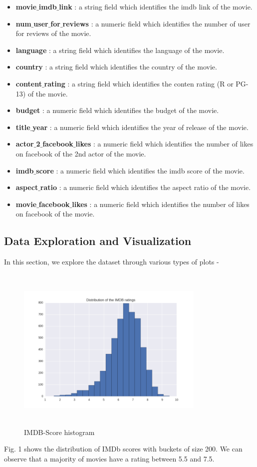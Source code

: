 \documentclass[conference]{IEEEtran}
\begin{document}
\begin{itemize}
	\item \textbf{movie$\_$imdb$\_$link} : a string field which identifies the imdb link of the movie. 
	\item \textbf{num$\_$user$\_$for$\_$reviews} : a numeric field which identifies the number of user for reviews of the movie. 
	\item \textbf{language}  : a string field which identifies the language of the movie.
	\item \textbf{country}  : a string field which identifies the country of the movie.
	\item \textbf{content$\_$rating} : a string field which identifies the conten rating (R or PG-13) of the movie.
	\item \textbf{budget} : a numeric field which identifies the budget of the movie.
	\item \textbf{title$\_$year} : a numeric field which identifies the year of release of the movie. 
	\item \textbf{actor$\_$2$\_$facebook$\_$likes} : a numeric field which identifies the number of likes on facebook of the 2nd actor of the movie.
	\item \textbf{imdb$\_$score} : a numeric field which identifies the imdb score of the movie.
	\item \textbf{aspect$\_$ratio}  : a numeric field which identifies the aspect ratio of the movie. 
	\item \textbf{movie$\_$facebook$\_$likes}  : a numeric field which identifies the number of likes on facebook of the movie.\\
\end{itemize}
\subsection{Data Exploration and Visualization}
In this section, we explore the dataset through various types of plots -
\begin{figure}[H]
  \centering	
  \captionsetup{justification=centering}
  \includegraphics[height=8cm, width=9cm, trim={20mm 0mm 10mm 0mm},clip]{../visualizations/IMDB-Score-Histogram}
  \caption{IMDB-Score histogram}
  \label{fig:fig1}
\end{figure}
Fig. 1 shows the distribution of IMDb scores with buckets of size 200. We can observe that a majority of movies have a rating between 5.5 and 7.5.
\end{document}

